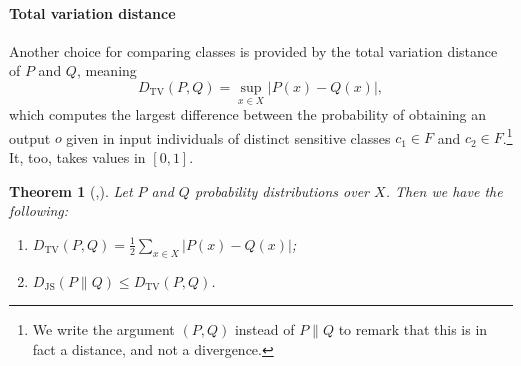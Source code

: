 \documentclass[
]{ceurart}
\newtheorem*{theorem*}{Theorem}
\begin{document}
\paragraph{Total variation distance}
Another choice for comparing classes is provided by the total variation distance of $P$ and $Q$, meaning
\[D_{\mathrm{TV}}(P, Q)= \sup _{x\in X} \vert P(x) - Q(x)\vert,\]
which computes the largest difference between the probability of obtaining an output $o$ given in input individuals of distinct sensitive classes $c_1\in F$ and $c_2\in F$.\footnote{We write the argument $(P,Q)$ instead of $P\parallel Q$ to remark that this is in fact a distance, and not a divergence.}  It, too, takes values in $[0,1]$. %

%

%

\begin{theorem*}[{\cite[Prop. 4.2]{levin2017markov}},{\cite[Thm. 3]{lin_divergence}}]
Let $P$ and $Q$ probability distributions over $X$. Then we have the following:
\begin{enumerate}
\item $D_{\mathrm{TV}}(P,Q)=\frac{1}{2}\sum_{x\in X}\vert P(x)-Q(x)\vert$;
\vspace{0.2cm}
\item $D_{\mathrm{JS}}(P\parallel Q)\leq D_\mathrm{TV}(P,Q)$.
\vspace{0.2cm}
\end{enumerate}
\end{theorem*}
\end{document}
